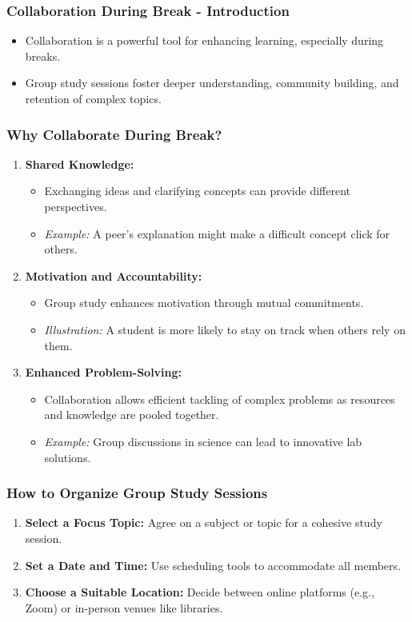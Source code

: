 \documentclass[aspectratio=169]{beamer}
\begin{document}
\begin{frame}[fragile]
    \frametitle{Collaboration During Break - Introduction}
    \begin{itemize}
        \item Collaboration is a powerful tool for enhancing learning, especially during breaks.
        \item Group study sessions foster deeper understanding, community building, and retention of complex topics.
    \end{itemize}
\end{frame}

\begin{frame}[fragile]
    \frametitle{Why Collaborate During Break?}
    \begin{enumerate}
        \item \textbf{Shared Knowledge:}
        \begin{itemize}
            \item Exchanging ideas and clarifying concepts can provide different perspectives.
            \item \textit{Example:} A peer's explanation might make a difficult concept click for others.
        \end{itemize}
        
        \item \textbf{Motivation and Accountability:}
        \begin{itemize}
            \item Group study enhances motivation through mutual commitments.
            \item \textit{Illustration:} A student is more likely to stay on track when others rely on them.
        \end{itemize}

        \item \textbf{Enhanced Problem-Solving:}
        \begin{itemize}
            \item Collaboration allows efficient tackling of complex problems as resources and knowledge are pooled together.
            \item \textit{Example:} Group discussions in science can lead to innovative lab solutions.
        \end{itemize}
    \end{enumerate}
\end{frame}

\begin{frame}[fragile]
    \frametitle{How to Organize Group Study Sessions}
    \begin{enumerate}
        \item \textbf{Select a Focus Topic:} Agree on a subject or topic for a cohesive study session.
        \item \textbf{Set a Date and Time:} Use scheduling tools to accommodate all members.
        \item \textbf{Choose a Suitable Location:} Decide between online platforms (e.g., Zoom) or in-person venues like libraries.
    \end{enumerate}
\end{frame}
\end{document}
